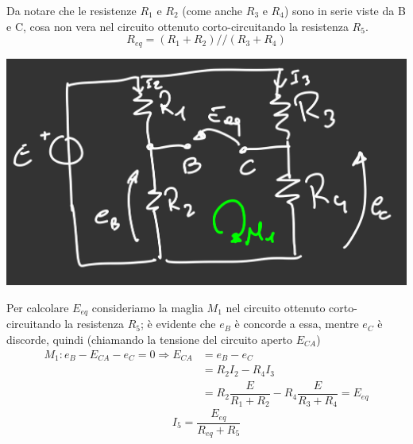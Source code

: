 \documentclass{article}
\begin{document}
Da notare che le resistenze $R_1$ e $R_2$ (come anche $R_3$ e $R_4$) sono in serie viste da B e C, cosa non vera nel circuito ottenuto corto-circuitando la resistenza $R_5$.
\[
    R_{eq} = (R_1+R_2) // (R_3+R_4)
\]
\begin{center}
    \includegraphics[scale=0.3]{Image/Esercizio_Thevenin_4.png}
\end{center}
Per calcolare $E_{eq}$ consideriamo la maglia $M_1$ nel circuito ottenuto corto-circuitando la resistenza $R_5$; è evidente che $e_B$ è concorde a essa, mentre $e_C$ è discorde, quindi (chiamando la tensione del circuito aperto $E_{CA}$)
\begin{align*}
    M_1: e_B - E_{CA} - e_C= 0 \Longrightarrow E_{CA} &= e_B - e_C\\
    &= R_2I_2 - R_4I_3\\
    &=R_2 \dfrac{E}{R_1+R_2} - R_4 \dfrac{E}{R_3+R_4} = E_{eq}
\end{align*}
\[
    I_5 = \frac{E_{eq}}{R_{eq}+R_5}
\]
\end{document}
